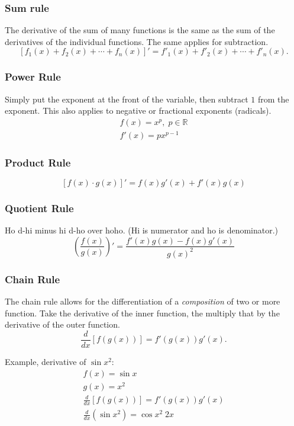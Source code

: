 \documentclass[12pt]{article}
\begin{document}
            \subsubsection{Sum rule}
                The derivative of the sum of many functions is the same as the sum of the derivatives of the individual functions. The same applies for subtraction.
                \[ \left[ f_1(x) + f_2(x) + \cdots + f_n(x) \right]' = f'_1(x) + f'_2(x) + \cdots + f'_n(x). \]

            \subsubsection{Power Rule}
                Simply put the exponent at the front of the variable, then subtract $1$ from the exponent. This also applies to negative or fractional exponents (radicals).
                \begin{gather*}
                    f(x) = x^p, \; p \in \mathbb{R} \\
                    f'(x) = px^{p-1}
                \end{gather*}

            \subsubsection{Product Rule}
                \[ \left[ f(x) \cdot g(x) \right]' = f(x)g'(x) + f'(x)g(x) \]

            \subsubsection{Quotient Rule}
                \noindent Ho d-hi minus hi d-ho over hoho. (Hi is numerator and ho is denominator.)
                \[ \left( \frac{f(x)}{g(x)} \right)' = \frac{f'(x)g(x) - f(x)g'(x)}{g(x)^2} \]

            \subsubsection{Chain Rule}
                The chain rule allows for the differentiation of a \textit{composition} of two or more function. Take the derivative of the inner function, the multiply that by the derivative of the outer function.
                \[ \frac{d}{dx} \left[ f \left( g(x) \right) \right] = f' \left( g(x) \right) g'(x). \]

                \noindent Example, derivative of $\sin{x^2}$:
                \begin{gather*}
                    f(x) = \sin{x} \\
                    g(x) = x^2 \\
                    \frac{d}{dx} \left[ f \left( g(x) \right) \right] = f' \left( g(x) \right) g'(x) \\
                    \frac{d}{dx} \left( \sin{x^2} \right) = \cos{x^2} \; 2x
                \end{gather*}
\end{document}
